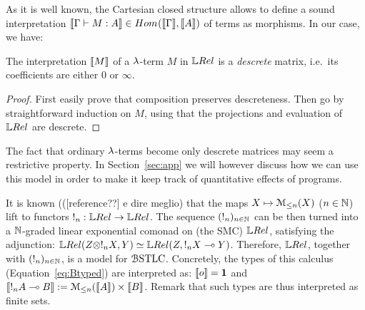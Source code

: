 As it is well known, the Cartesian closed structure %
allows to define a sound interpretation $\model{\Gamma\vdash M:A}\in\HOM{}{\model \Gamma}{\model A}$ of terms as morphisms.
In our case, we have:

\begin{proposition}\label{prop:descrete}
 The interpretation $\llbracket M\rrbracket$ of a $\lambda$-term $M$ in $\LREL$ is a \emph{descrete} matrix, i.e.\ its coefficients are either $0$ or $\infty$.
\end{proposition}
\begin{proof}
 First easily prove that composition preserves descreteness.
 Then go by straightforward induction on $M$, using that the projections and evaluation of  $\LREL$ are descrete.
\end{proof}

The fact that ordinary $\lambda$-terms become only descrete matrices may seem a restrictive property.
In Section~\ref{sec:app} we will however discuss how we can use this model in order to make it keep track of quantitative effects of programs.

\begin{remark}\label{rmk:ModelsOfBSTLC}
It is known {\color{red}(([reference??] e dire meglio)} that the maps $X\mapsto \mathcal{M}_{\leq n}(X)$ ($n\in\mathbb{N}$) lift to functors $!_n:\LREL\to\LREL$.
The sequence $(!_n)_{n\in\mathbb{N}}$ can be then turned into a $\mathbb{N}$-graded linear exponential comonad on (the SMC) $\LREL$, satisfying the adjunction:
$\LREL(Z\otimes !_{n}X,Y) \simeq \LREL(Z, !_{n}X\multimap Y)$.
Therefore, $\LREL$, together with $(!_n)_{n\in\mathbb{N}}$, is a model for $\mathcal{B}\mathrm{STLC}$. 
Concretely, the types of this calculus (Equation~\ref{eq:Btyped}) are interpreted as: $\llbracket o\rrbracket=\mathbf{1}$ and 
$\llbracket!_{n}A\multimap B\rrbracket:= \mathcal{M}_{\leq n}(\llbracket A\rrbracket) \times \llbracket B\rrbracket$.
Remark that such types are thus interpreted as finite sets.
\end{remark}



